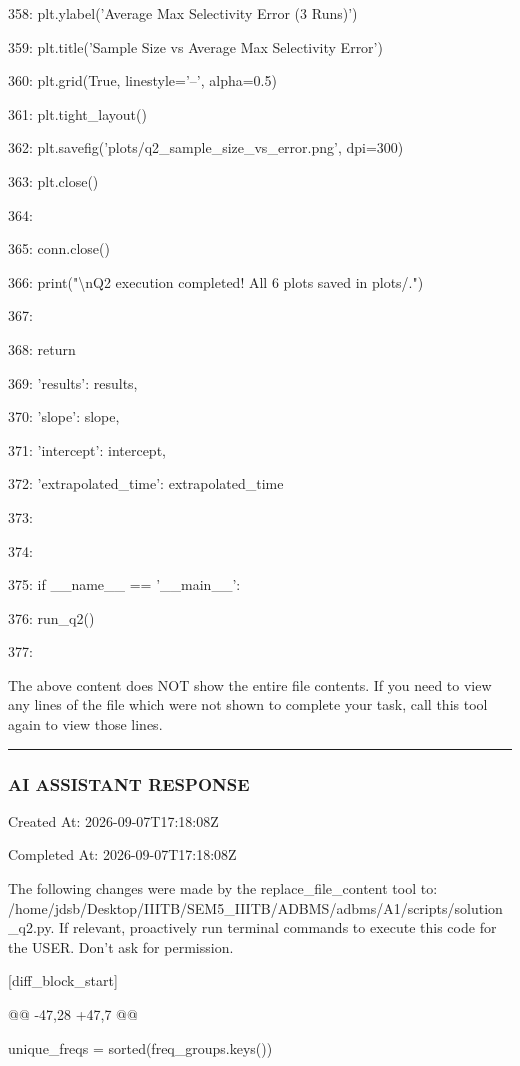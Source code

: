 \documentclass[11pt,a4paper]{article}
\begin{document}
358:     plt.ylabel('Average Max Selectivity Error (3 Runs)')

359:     plt.title('Sample Size vs Average Max Selectivity Error')

360:     plt.grid(True, linestyle='--', alpha=0.5)

361:     plt.tight\_layout()

362:     plt.savefig('plots/q2\_sample\_size\_vs\_error.png', dpi=300)

363:     plt.close()

364:

365:     conn.close()

366:     print("\textbackslash{}nQ2 execution completed! All 6 plots saved in plots/.")

367:

368:     return {

369:         'results': results,

370:         'slope': slope,

371:         'intercept': intercept,

372:         'extrapolated\_time': extrapolated\_time

373:     }

374:

375: if \_\_name\_\_ == '\_\_main\_\_':

376:     run\_q2()

377:

The above content does NOT show the entire file contents. If you need to view any lines of the file which were not shown to complete your task, call this tool again to view those lines.


\hrule

\subsubsection{AI ASSISTANT RESPONSE}

Created At: 2026-09-07T17:18:08Z

Completed At: 2026-09-07T17:18:08Z

The following changes were made by the replace\_file\_content tool to: /home/jdsb/Desktop/IIITB/SEM5\_IIITB/ADBMS/adbms/A1/scripts/solution\_q2.py. If relevant, proactively run terminal commands to execute this code for the USER. Don't ask for permission.

[diff\_block\_start]

@@ -47,28 +47,7 @@

unique\_freqs = sorted(freq\_groups.keys())
\end{document}
